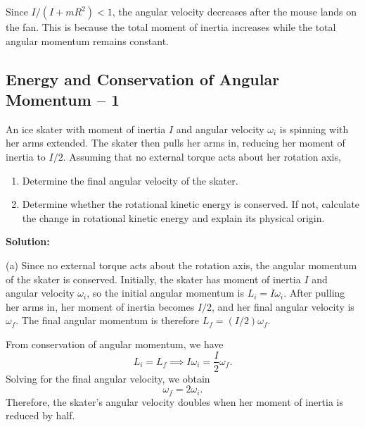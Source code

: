\documentclass[../main.tex]{subfiles}
\begin{document}
Since $I/(I+mR^2)<1$, the angular velocity decreases after the mouse lands on the fan. This is because the total moment of inertia increases while the total angular momentum remains constant.

\subsection{Energy and Conservation of Angular Momentum -- 1}

An ice skater with moment of inertia $I$ and angular velocity $\omega_i$ is spinning with her arms extended. The skater then pulls her arms in, reducing her moment of inertia to $I/2$. Assuming that no external torque acts about her rotation axis,
\begin{enumerate}
    \item[(a)] Determine the final angular velocity of the skater.
    \item[(b)] Determine whether the rotational kinetic energy
    is conserved. If not, calculate the change in rotational
    kinetic energy and explain its physical origin.
\end{enumerate}

\textbf{Solution:}

(a) Since no external torque acts about the rotation axis, the angular momentum of the skater is conserved. Initially, the skater has moment of inertia $I$ and angular velocity $\omega_i$, so the initial angular momentum is $L_i=I\omega_i$. After pulling her arms in, her moment of inertia becomes $I/2$, and her final angular velocity is $\omega_f$. The final angular momentum is therefore $L_f=(I/2)\omega_f$.

From conservation of angular momentum, we have
\begin{equation}
    L_i=L_f
    \implies I\omega_i=\frac{I}{2}\omega_f.
\end{equation}
Solving for the final angular velocity, we obtain
\begin{equation}
    \boxed{\omega_f=2\omega_i}.
\end{equation}
Therefore, the skater's angular velocity doubles when her moment of inertia is reduced by half.
\end{document}
